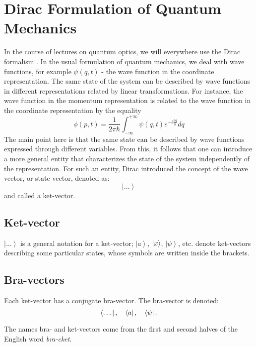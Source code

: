 \section{Dirac Formulation of Quantum Mechanics}
\label{AddDirac}
In the course of lectures on quantum optics, we will everywhere use the 
Dirac formalism \cite{bDiracPrincipleQuantumMechanic}. In the usual formulation of quantum mechanics, we deal with wave functions, for example $\psi\left(q, t\right)$ - the wave function in the coordinate representation. The same state of the system can be described by wave functions in different representations related by linear transformations. For instance, the wave function in the momentum representation is related to the wave function in the coordinate representation by the equality 
\begin{equation}
\phi\left(p, t\right) = \frac{1}{2 \pi \hbar} \int_{-\infty}^{+\infty}
\psi \left(q, t\right) e^{-i \frac{p q}{\hbar}} dq
\end{equation}
The main point here is that the same state can be described by wave functions expressed through different variables. From this, it follows that one can introduce a more general entity that characterizes the state of the system independently of the representation. For such an entity, Dirac introduced the concept of the wave vector, or state vector, denoted as: 
\begin{equation}
\left| \dots \right>
\end{equation}
and called a ket-vector.

\subsection{Ket-vector}
$\left| \dots \right>$ is a general notation for a ket-vector; $\left| a \right>$,  $\ket{ x }$, $\left| \psi \right>$, etc. denote ket-vectors describing some particular states, whose symbols are written inside the brackets.

\subsection{Bra-vectors}
Each ket-vector has a conjugate bra-vector. The bra-vector is denoted: 
\begin{equation}
\left< \dots \right|, \quad 
\bra{ a }, \quad  
\left< \psi \right|.
\end{equation}

The names bra- and ket-vectors come from the first and second halves of the English word {\itshape bra-cket}.

